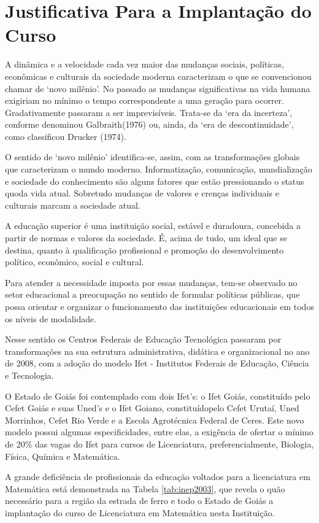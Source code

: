 \section{Justificativa Para a Implanta\c{c}\~{a}o do Curso}
\label{sec:just-impl-curso}

A dinâmica e a velocidade cada vez maior das mudanças sociais,
políticas, econômicas e culturais da sociedade moderna caracterizam o
que se convencionou chamar de `novo milênio'. No passado as mudanças
significativas na vida humana exigiriam no mínimo o tempo
correspondente a uma geração para ocorrer.  Gradativamente passaram a
ser imprevisíveis. Trata-se da `era da incerteza', conforme denominou
Galbraith(1976) ou, ainda, da `era de descontinuidade', como
classificou Drucker (1974).

O sentido de `novo milênio' identifica-se, assim, com as
transformações globais que caracterizam o mundo moderno.
Informatização, comunicação, mundialização e sociedade do conhecimento
são alguns fatores que estão pressionando o status quoda vida atual.
Sobretudo mudanças de valores e crenças individuais e culturais marcam
a sociedade atual.

A educação superior é uma instituição social, estável e duradoura,
concebida a partir de normas e valores da sociedade. É, acima de tudo,
um ideal que se destina, quanto à qualificação profissional e promoção
do desenvolvimento político, econômico, social e cultural.

Para atender a necessidade imposta por essas mudanças, tem-se
observado no setor educacional a preocupação no sentido de formular
políticas públicas, que possa orientar e organizar o funcionamento das
instituições educacionais em todos os níveis de modalidade.

Nesse sentido os Centros Federais de Educação Tecnológica passaram por
transformações na sua estrutura administrativa, didática e
organizacional no ano de 2008, com a adoção do modelo Ifet -
Institutos Federais de Educação, Ciência e Tecnologia.

O Estado de Goiás foi contemplado com dois Ifet's: o Ifet Goiás,
constituído pelo Cefet Goiás e suas Uned's e o Ifet Goiano,
constituídopelo Cefet Urutaí, Uned Morrinhos, Cefet Rio Verde e a
Escola Agrotécnica Federal de Ceres. Este novo modelo possui algumas
especificidades, entre elas, a exigência de ofertar o mínimo de 20\%
das vagas do Ifet para cursos de Licenciatura, preferencialmente,
Biologia, Física, Química e Matemática.

A grande deficiência de profissionais da educação voltados para a
licenciatura em Matemática está demonstrada na Tabela
\ref{tab:inep2003}, que revela o quão necessário para a região da
estrada de ferro e todo o Estado de Goiás a implantação do curso de
Licenciatura em Matemática nesta Instituição.


